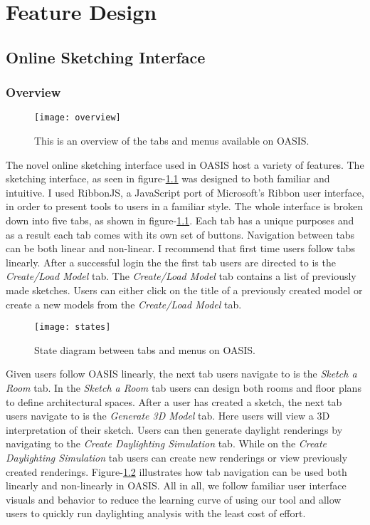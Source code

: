 \chapter{Feature Design} \label{sec:introduction}

\section{Online Sketching Interface}

	\subsection{Overview}

		\begin{figure}[t]
		\centering
		\texttt{[image: overview]}
		\caption{This is an overview of the tabs and menus available on OASIS.}
		\label{fig:overview}
		\end{figure}

		The novel online sketching interface used in OASIS host a variety of features.
		The sketching interface, as seen in figure-\ref{fig:overview} was designed to both familiar and intuitive.
		I used RibbonJS, a JavaScript port of Microsoft's Ribbon user interface, in order to present tools to users in a familiar style\cite{ribbonjs}. 
		The whole interface is broken down into five tabs, as shown in figure-\ref{fig:overview}.
		Each tab has a unique purposes and as a result each tab comes with its own set of buttons.
		Navigation between tabs can be both linear and non-linear. 
		I recommend that first time users follow tabs linearly. 
		After a successful login the the first tab users are directed to is the \textit{Create/Load Model} tab.
		The \textit{Create/Load Model} tab contains a list of previously made sketches.
		Users can either click on the title of a previously created model or create a new models from the \textit{Create/Load Model} tab.\\

		\begin{figure}[t]
		\centering
		\texttt{[image: states]}
		\caption{State diagram between tabs and menus on OASIS.}
		\label{fig:states}
		\end{figure}

		Given users follow OASIS linearly, the next tab users navigate to is the \textit{Sketch a Room} tab. 
		In the \textit{Sketch a Room} tab users can design both rooms and floor plans to define architectural spaces.
		After a user has created a sketch, the next tab users navigate to is the \textit{Generate 3D Model} tab. 
		Here users will view a 3D interpretation of their sketch. 
		Users can then generate daylight renderings by navigating to the \textit{Create Daylighting Simulation} tab.
		While on the \textit{Create Daylighting Simulation} tab users can create new renderings or view previously created renderings.
		Figure-\ref{fig:states} illustrates how tab navigation can be used both linearly and non-linearly in OASIS.
		All in all, we follow familiar user interface visuals and behavior to reduce the learning curve of using our tool and allow users to quickly run daylighting analysis with the least cost of effort.\\

